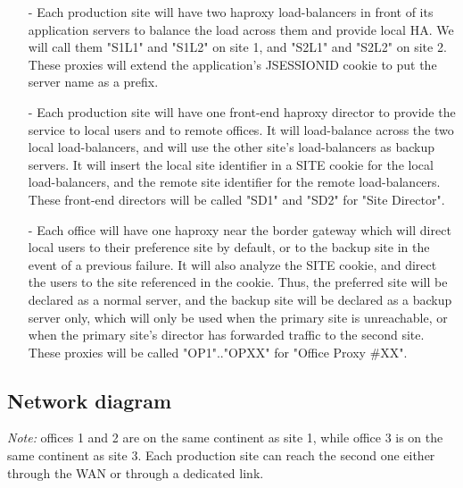 \begin{itemize}
\item[-] Each production site will have two haproxy load-balancers in front of its
    application servers to balance the load across them and provide local HA.
    We will call them "S1L1" and "S1L2" on site 1, and "S2L1" and "S2L2" on
    site 2. These proxies will extend the application's JSESSIONID cookie to
    put the server name as a prefix.

\item[-] Each production site will have one front-end haproxy director to provide
    the service to local users and to remote offices. It will load-balance
    across the two local load-balancers, and will use the other site's
    load-balancers as backup servers. It will insert the local site identifier
    in a SITE cookie for the local load-balancers, and the remote site
    identifier for the remote load-balancers. These front-end directors will
    be called "SD1" and "SD2" for "Site Director".

\item[-] Each office will have one haproxy near the border gateway which will direct
    local users to their preference site by default, or to the backup site in
    the event of a previous failure. It will also analyze the SITE cookie, and
    direct the users to the site referenced in the cookie. Thus, the preferred
    site will be declared as a normal server, and the backup site will be
    declared as a backup server only, which will only be used when the primary
    site is unreachable, or when the primary site's director has forwarded
    traffic to the second site. These proxies will be called "OP1".."OPXX"
    for "Office Proxy \#XX".
\end{itemize}
  
\subsection{Network diagram}

\emph{Note:} offices 1 and 2 are on the same continent as site 1, while
       office 3 is on the same continent as site 3. Each production
       site can reach the second one either through the WAN or through
       a dedicated link.

